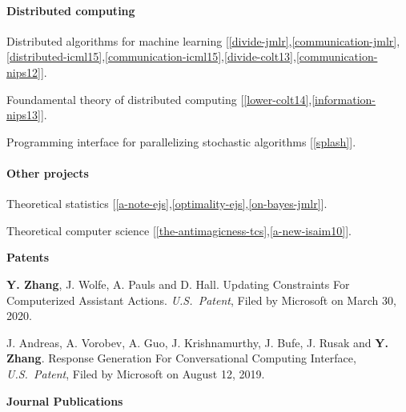 \documentclass{res}
\newenvironment{my_item}{
\begin{itemize}
  \setlength{\itemsep}{0pt}
  \setlength{\parskip}{0pt}
  \setlength{\parsep}{0pt}}
{\end{itemize}
}
\begin{document}
\begin{resume}
\vspace{-10pt}
\paragraph{Distributed computing}
\begin{my_item}
\item Distributed algorithms for machine learning [\ref{divide-jmlr},\ref{communication-jmlr},\ref{distributed-icml15},\ref{communication-icml15},\ref{divide-colt13},\ref{communication-nips12}].
\item Foundamental theory of distributed computing [\ref{lower-colt14},\ref{information-nips13}].
\item Programming interface for parallelizing stochastic algorithms [\ref{splash}].
\end{my_item}

\vspace{-10pt}
\paragraph{Other projects}
\begin{my_item}
\item Theoretical statistics [\ref{a-note-ejs},\ref{optimality-ejs},\ref{on-bayes-jmlr}].
\item Theoretical computer science [\ref{the-antimagicness-tcs},\ref{a-new-isaim10}].
\end{my_item}

{\bf\Large Patents}
\vspace{5pt}

\begin{enumerate}[label={[P\arabic*]}, ref={P\arabic*}]
\item \label{updating-patent} \textbf{Y. Zhang}, J. Wolfe, A. Pauls and D. Hall. Updating Constraints For Computerized Assistant Actions. \emph{U.S.~Patent}, Filed by Microsoft on March 30, 2020.
\item \label{reponse-patent} J. Andreas, A. Vorobev, A. Guo, J. Krishnamurthy, J. Bufe, J. Rusak and \textbf{Y. Zhang}. Response Generation For Conversational Computing Interface, \emph{U.S.~Patent}, Filed by Microsoft on August 12, 2019.
\end{enumerate}

{\bf\Large Journal Publications}
\vspace{5pt}

\begin{enumerate}[label={[J\arabic*]}, ref={J\arabic*}]


\end{enumerate}
\end{resume}
\end{document}
